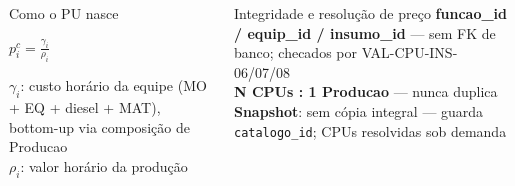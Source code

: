\documentclass[aspectratio=169,10pt]{beamer}
\begin{document}
\begin{frame}
\begin{columns}[T]
{}
    \begin{block}{\small Como o PU nasce}
      \scriptsize
      \centerline{$p_i^c = \frac{\gamma_i}{\rho_i}$}
      \smallskip

      $\gamma_i$: custo horário da equipe (MO + EQ + diesel + MAT), bottom-up
      via composição de Producao\\
      $\rho_i$: valor horário da produção
    \end{block}
    \vspace{1pt}
    \begin{block}{\small Integridade e resolução de preço}
      \scriptsize
      \textbf{funcao\_id / equip\_id / insumo\_id} --- sem FK de banco;
      checados por VAL-CPU-INS-06/07/08\\[2pt]
      \textbf{N CPUs : 1 Producao} --- nunca duplica \\[2pt]
      \textbf{Snapshot}: sem cópia integral --- guarda
      \texttt{catalogo\_id}; CPUs resolvidas sob demanda
    \end{block}
  \end{columns}
\end{frame}
\end{document}
